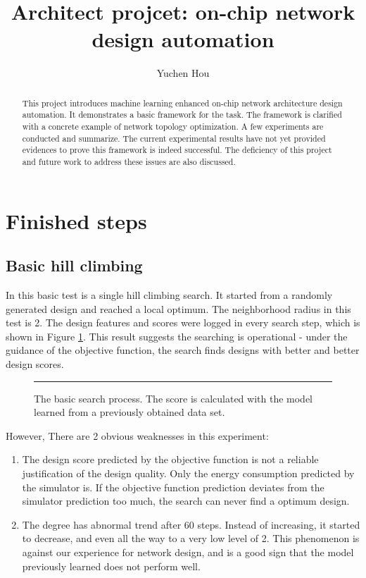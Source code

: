 \documentclass[12pt]{article}
\theoremstyle{definition}
\begin{document}
\title{Architect projcet: on-chip network design automation}
\author{Yuchen Hou}
\maketitle

\begin{abstract}
  This project introduces machine learning enhanced on-chip network architecture design automation. It demonstrates a basic framework for the task. The framework is clarified with a concrete example of network topology optimization. A few experiments are conducted and summarize. The current experimental results have not yet provided evidences to prove this framework is indeed successful. The deficiency of this project and future work to address these issues are also discussed.
\end{abstract}

\section{Finished steps}
\subsection{Basic hill climbing}
In this basic test is a single hill climbing search. It started from a randomly generated design and reached a local optimum. The neighborhood radius in this test is 2. The design features and scores were logged in every search step, which is shown in Figure \ref{fig:trace}. This result suggests the searching is operational - under the guidance of the objective function, the search finds designs with better and better design scores.
\begin{figure}[htb]
    \centering
    \begin{subfigure}
      {\texttt{[image: trace-2014-12-18.png]}}
    \end{subfigure}
    \rule{\linewidth}{1pt}
    \caption{The basic search process. The score is calculated with the model learned from a previously obtained data set.}
    \label{fig:trace}
\end{figure}
However, There are 2 obvious weaknesses in this experiment:
\begin{enumerate}
  \item The design score predicted by the objective function is not a reliable justification of the design quality. Only the energy consumption predicted by the simulator is. If the objective function prediction deviates from the simulator prediction too much, the search can never find a optimum design.
  \item The degree has abnormal trend after 60 steps. Instead of increasing, it started to decrease, and even all the way to a very low level of 2. This phenomenon is against our experience for network design, and is a good sign that the model previously learned does not perform well.
\end{enumerate}
\end{document}
